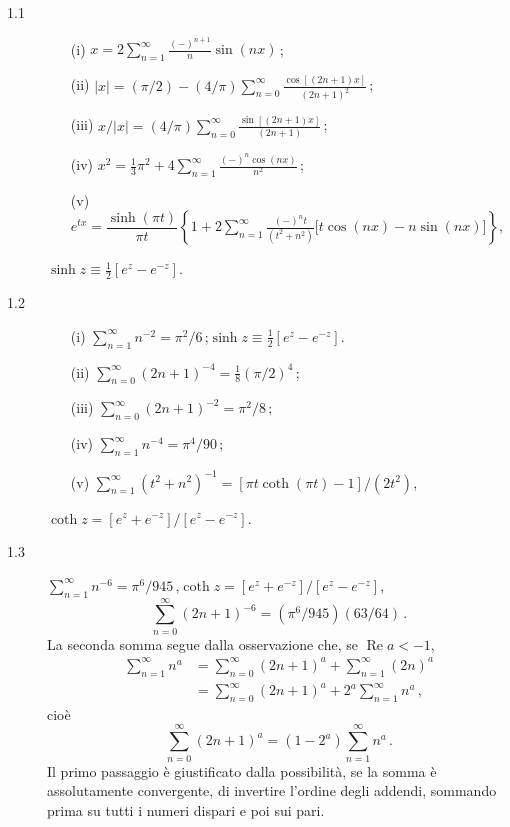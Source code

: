 \documentclass[11pt, a4paper]{book}
\numberwithin{equation}{section}
\begin{document}
\begin{description}
\item[1.1]
\begin{enumerate}
  \item[(i)] $x = 2\displaystyle\sum_{n=1}^{\infty}\frac{(-)^{n+1}}{n}\sin(nx)$\,;
  \item[(ii)] $|x| = (\pi/2) - (4/\pi)\displaystyle\sum_{n=0}^{\infty}\frac{\cos[(2n+1)x]}{(2n+1)^2}$\,;
  \item[(iii)] $x/|x| = (4/\pi)\displaystyle\sum_{n=0}^{\infty}\frac{\sin[(2n+1)x]}{(2n+1)}$\,;
  \item[(iv)] $x^2 = \tfrac{1}{3}\pi^2 + 4\displaystyle\sum_{n=1}^{\infty}\frac{(-)^n\cos(nx)}{n^2}$\,;
  \item[(v)] $e^{tx} = \dfrac{\sinh(\pi t)}{\pi t}\left\{1+2\displaystyle\sum_{n=1}^{\infty}\frac{(-)^n t}{(t^2+n^2)}\bigl[t\cos(nx)-n\sin(nx)\bigr]\right\}$,
\end{enumerate}
\quad$\sinh z \equiv \tfrac{1}{2}[e^z - e^{-z}]$.

\item[1.2]
\begin{enumerate}
  \item[(i)] $\displaystyle\sum_{n=1}^{\infty} n^{-2} = \pi^2/6$\,;\quad $\sinh z \equiv \tfrac{1}{2}[e^z-e^{-z}]$.
  \item[(ii)] $\displaystyle\sum_{n=0}^{\infty}(2n+1)^{-4} = \tfrac{1}{8}(\pi/2)^4$\,;
  \item[(iii)] $\displaystyle\sum_{n=0}^{\infty}(2n+1)^{-2} = \pi^2/8$\,;
  \item[(iv)] $\displaystyle\sum_{n=1}^{\infty} n^{-4} = \pi^4/90$\,;
  \item[(v)] $\displaystyle\sum_{n=1}^{\infty}(t^2+n^2)^{-1} = [\pi t\coth(\pi t)-1]/(2t^2)$,
\end{enumerate}
$\coth z = [e^z+e^{-z}]/[e^z-e^{-z}]$.

\item[1.3] $\displaystyle\sum_{n=1}^{\infty} n^{-6} = \pi^6/945$\,,\quad $\coth z = [e^z+e^{-z}]/[e^z-e^{-z}]$,
\[
  \sum_{n=0}^{\infty}(2n+1)^{-6} = (\pi^6/945)(63/64)\,.
\]
La seconda somma segue dalla osservazione che, se $\operatorname{Re}a < -1$,
\begin{align*}
  \sum_{n=1}^{\infty} n^a &= \sum_{n=0}^{\infty}(2n+1)^a + \sum_{n=1}^{\infty}(2n)^a\\
  &= \sum_{n=0}^{\infty}(2n+1)^a + 2^a\sum_{n=1}^{\infty} n^a\,,
\end{align*}
cioè
\[
  \sum_{n=0}^{\infty}(2n+1)^a = (1-2^a)\sum_{n=1}^{\infty} n^a\,.
\]
Il primo passaggio è giustificato dalla possibilità, se la somma è assolutamente convergente, di invertire l'ordine degli addendi, sommando prima su tutti i numeri dispari e poi sui pari.


\end{description}
\end{document}
